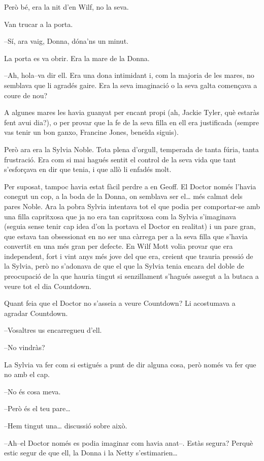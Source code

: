 Però bé, era la nit d'en Wilf, no la seva.

Van trucar a la porta.

--Sí, ara vaig, Donna, dóna'ns un minut.

La porta es va obrir. Era la mare de la Donna.

--Ah, hola--va dir ell. Era una dona intimidant i, com la majoria de les
mares, no semblava que li agradés gaire. Era la seva imaginació o la
seva galta començava a coure de nou?

A algunes mares les havia guanyat per encant propi (ah, Jackie Tyler,
què estaràs fent avui dia?), o per provar que la fe de la seva filla en
ell era justificada (sempre vas tenir un bon ganxo, Francine Jones,
beneïda siguis).

Però ara era la Sylvia Noble. Tota plena d'orgull, temperada de tanta
fúria, tanta frustració. Era com si mai hagués sentit el control de la
seva vida que tant s'esforçava en dir que tenia, i que allò li enfadés
molt.

Per suposat, tampoc havia estat fàcil perdre a en Geoff. El Doctor només
l'havia conegut un cop, a la boda de la Donna, on semblava ser
el\ldots{} més calmat dels pares Noble. Ara la pobra Sylvia intentava
tot el que podia per comportar-se amb una filla capritxosa que ja no era
tan capritxosa com la Sylvia s'imaginava (seguia sense tenir cap idea
d'on la portava el Doctor en realitat) i un pare gran, que estava tan
obsessionat en no ser una càrrega per a la seva filla que s'havia
convertit en una més gran per defecte. En Wilf Mott volia provar que era
independent, fort i vint anys més jove del que era, creient que trauria
pressió de la Sylvia, però no s'adonava de que el que la Sylvia tenia
encara del doble de preocupació de la que hauria tingut si senzillament
s'hagués assegut a la butaca a veure tot el dia Countdown.

Quant feia que el Doctor no s'asseia a veure Countdown? Li acostumava a
agradar Countdown.

--Vosaltres us encarregueu d'ell.

--No vindràs?

La Sylvia va fer com si estigués a punt de dir alguna cosa, però només
va fer que no amb el cap.

--No és cosa meva.

--Però és el teu pare\ldots{}

--Hem tingut una\ldots{} discussió sobre això.

--Ah--el Doctor només es podia imaginar com havia anat--. Estàs segura?
Perquè estic segur de que ell, la Donna i la Netty s'estimarien\ldots{}

